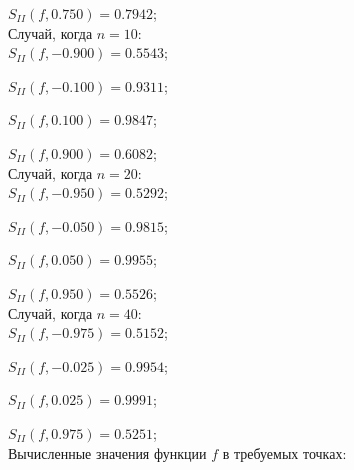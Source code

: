 \documentclass[rus, 12 pt]{article}
\begin{document}
    
    $S_{II}(f,0.750)=0.7942$;\\

    
    

    
    Случай, когда $n=10$:\\

    
    

    
    $S_{II}(f,-0.900)=0.5543$;

    
    $S_{II}(f,-0.100)=0.9311$;

    
    $S_{II}(f,0.100)=0.9847$;

    
    $S_{II}(f,0.900)=0.6082$;\\

    
    

    
    Случай, когда $n=20$:\\

    
    

    
    $S_{II}(f,-0.950)=0.5292$;

    
    $S_{II}(f,-0.050)=0.9815$;

    
    $S_{II}(f,0.050)=0.9955$;

    
    $S_{II}(f,0.950)=0.5526$;\\

    
    

    
    Случай, когда $n=40$:\\

    
    

    
    $S_{II}(f,-0.975)=0.5152$;

    
    $S_{II}(f,-0.025)=0.9954$;

    
    $S_{II}(f,0.025)=0.9991$;

    
    $S_{II}(f,0.975)=0.5251$;\\

    
    

    
    Вычисленные значения функции \(f\) в требуемых точках:
\end{document}
